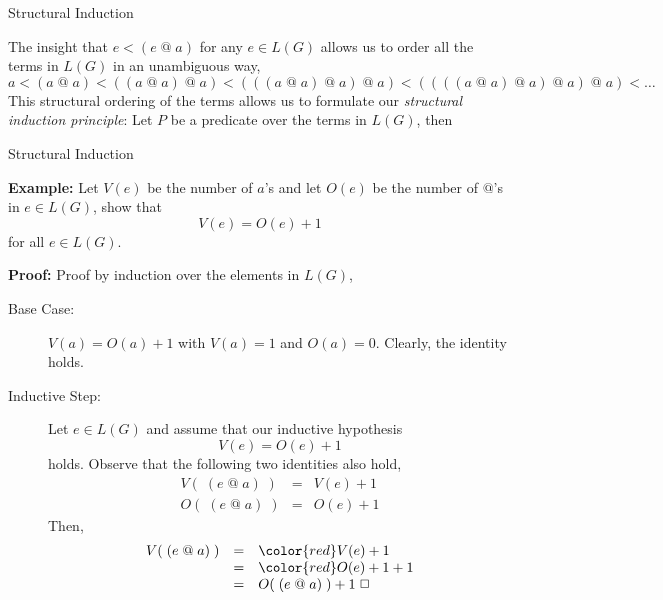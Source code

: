 \documentclass{beamer}
\begin{document}
\begin{frame}{Structural Induction}

\scriptsize
The insight that $e < (e\; @ \; a)$  for any $e\in L(G)$ allows us to order all the terms in $L(G)$ in an unambiguous way,
\[
a <(a \;@ \;a)< ((a\; @ \; a)\; @ \; a)< (((a\; @ \; a)\; @ \; a)\; @ \; a)<((((a\; @ \; a)\; @ \; a)\; @ \; a)\; @ \; a)< \dots
\]
This structural ordering of the terms allows us to formulate our {\em structural induction principle}:  Let $P$
be a predicate over the terms in $L(G)$, then
\end{frame}

\begin{frame}{Structural Induction}

\scriptsize
{\bf Example:} Let $V(e)$ be the number of $a$'s and let $O(e)$ be the number of $@$'s in $e\in L(G)$, show that
\[
V(e) = O(e) + 1
\]
for all $e \in L(G)$.

\vspace{.1in}
{\bf Proof:} Proof by induction over the elements in $L(G)$,
\begin{description}
\item[Base Case:] $V(a) = O(a) + 1$ with $V(a) = 1$ and $O(a)=0$.  Clearly, the identity holds.
\item[Inductive Step:] Let $e \in L(G)$ and assume that our inductive hypothesis
\[
V(e) = O(e) + 1
\]
holds. Observe that the following two identities also hold,
\begin{eqnarray*}
V(\;(e\; @ \; a)\;) &=& V(e) + 1\\
O(\;(e\; @ \; a)\;) &=& O(e) + 1
\end{eqnarray*}
Then,
\[
\begin{array}{rcl}
V(\;(e\; @ \; a)\;) &=& {\color{red}V(e)} + 1\\
	&=&  {\color{red}O(e) + 1} + 1\\
	&=& O(\;(e\; @ \; a)\;) + 1 \;\Box
\end{array}
\]
\end{description}

\end{frame}
\end{document}
